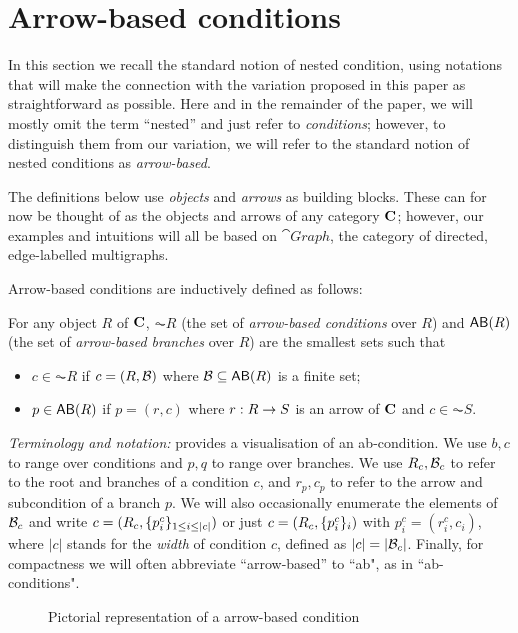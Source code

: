 \section{Arrow-based conditions}

In this section we recall the standard notion of nested condition, using notations that will make the connection with the variation proposed in this paper as straightforward as possible. Here and in the remainder of the paper, we will mostly omit the term ``nested'' and just refer to \emph{conditions}; however, to distinguish them from our variation, we will refer to the standard notion of nested conditions as \emph{arrow-based}.

The definitions below use \emph{objects} and \emph{arrows} as building blocks. These can for now be thought of as the objects and arrows of any category $\mathbf{C}$; however, our examples and intuitions will all be based on $\cat{Graph}$, the category of directed, edge-labelled multigraphs. 

Arrow-based conditions are inductively defined as follows:

\begin{definition}
  For any object $R$ of $\mathbf{C}$, $\AC R$ (the set of \emph{arrow-based conditions} over $R$) and $\AB R$ (the set of \emph{arrow-based branches} over $R$) are the smallest sets such that
  \begin{itemize}
  \item $c\in \AC R$ if $c=(R,\mathcal{B})$ where $\cB\subseteq \AB R$ is a finite set;
  \item $p\in \AB R$ if $p=(r,c)$ where $r: R\rightarrow S$ is an arrow of $\mathbf{C}$ and $c\in \AC S$.
  \end{itemize}
\end{definition}

\medskip\noindent
\emph{Terminology and notation:}  provides a visualisation of an ab-condition. We use $b,c$ to range over conditions and $p,q$ to range over branches. We use $R_c,\mathcal{B}_c$ to refer to the root and branches of a condition $c$, and $r_p,c_p$ to refer to the arrow and subcondition of a branch $p$. We will also occasionally enumerate the elements of $\mathcal{B}_c$ and write $c=(R_c, \{{p^c_i}\}_{1\leq i\leq |c|})$ or just $c=(R_c, \{{p^c_i}\}_i)$ with $p^c_i=(r^c_i,c_i)$, where $|c|$ stands for the \emph{width} of condition $c$, defined as $|c|=|\mathcal{B}_c|$. Finally, for compactness we will often abbreviate ``arrow-based'' to ``ab", as in ``ab-conditions".
%
\begin{figure}
  \centering
  
  \caption{Pictorial representation of a arrow-based condition}
\end{figure}

